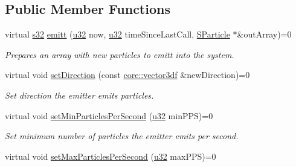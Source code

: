 \subsection*{Public Member Functions}
\begin{DoxyCompactItemize}
\item 
virtual \hyperlink{namespaceirr_ac66849b7a6ed16e30ebede579f9b47c6}{s32} \hyperlink{classirr_1_1scene_1_1IParticleEmitter_aaf773f8ce5db3b5a2455561ef7818506}{emitt} (\hyperlink{namespaceirr_a0416a53257075833e7002efd0a18e804}{u32} now, \hyperlink{namespaceirr_a0416a53257075833e7002efd0a18e804}{u32} time\+Since\+Last\+Call, \hyperlink{structirr_1_1scene_1_1SParticle}{S\+Particle} $\ast$\&out\+Array)=0
\begin{DoxyCompactList}\small\item\em Prepares an array with new particles to emitt into the system. \end{DoxyCompactList}\item 
\mbox{\label{classirr_1_1scene_1_1IParticleEmitter_abb433f4f96ad468c0314138743ae1044}} 
virtual void \hyperlink{classirr_1_1scene_1_1IParticleEmitter_abb433f4f96ad468c0314138743ae1044}{set\+Direction} (const \hyperlink{namespaceirr_1_1core_ae6e2b2a6c552833ebbd5b7463d03586b}{core\+::vector3df} \&new\+Direction)=0
\begin{DoxyCompactList}\small\item\em Set direction the emitter emits particles. \end{DoxyCompactList}\item 
\mbox{\label{classirr_1_1scene_1_1IParticleEmitter_af27d98a4e0251467238c10e2cc4fad0b}} 
virtual void \hyperlink{classirr_1_1scene_1_1IParticleEmitter_af27d98a4e0251467238c10e2cc4fad0b}{set\+Min\+Particles\+Per\+Second} (\hyperlink{namespaceirr_a0416a53257075833e7002efd0a18e804}{u32} min\+P\+PS)=0
\begin{DoxyCompactList}\small\item\em Set minimum number of particles the emitter emits per second. \end{DoxyCompactList}\item 
\mbox{\label{classirr_1_1scene_1_1IParticleEmitter_aba42268e14a02e3d97c88599ab82f881}} 
virtual void \hyperlink{classirr_1_1scene_1_1IParticleEmitter_aba42268e14a02e3d97c88599ab82f881}{set\+Max\+Particles\+Per\+Second} (\hyperlink{namespaceirr_a0416a53257075833e7002efd0a18e804}{u32} max\+P\+PS)=0

\end{DoxyCompactItemize}
